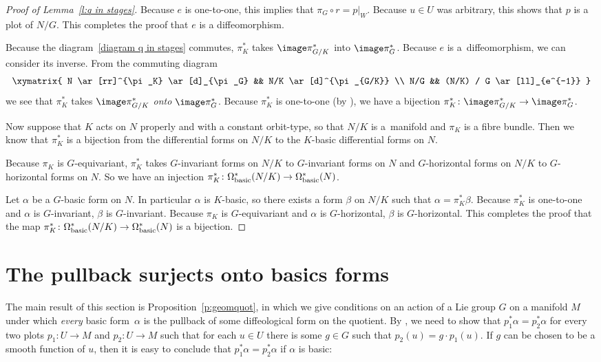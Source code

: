 \begin{proof}[Proof of Lemma~\ref{l:q in stages}]
Because $e$ is one-to-one, this implies that $\pi_G \circ r = p|_W$.
Because $u \in U$ was arbitrary, this shows that $p$ is a plot of $N/G$.
This completes the proof that $e$ is a dif\/feomorphism.

Because the diagram~\eqref{diagram q in stages} commutes, $\pi_K^*$
takes $\image \pi_{G/K}^*$ into $\image \pi_G^*$.
Because $e$ is a~dif\/feomorphism, we can consider its inverse.
From the commuting diagram
\begin{gather*} \xymatrix{
 N \ar[rr]^{\pi_K} \ar[d]_{\pi_G} && N/K \ar[d]^{\pi_{G/K}} \\
  N/G &&   (N/K) / G \ar[ll]_{e^{-1}}
} \end{gather*}
we see that $\pi_K^*$ takes $\image \pi_{G/K}^*$ \emph{onto} $\image \pi_G^*$.
Because $\pi_K^*$ is one-to-one (by ),
we have a bijection
$\pi_K^* \colon \image \pi_{G/K}^* \to \image \pi_G^*$.

Now suppose that $K$ acts on $N$ properly and with a constant orbit-type,
so that $N/K$ is a~mani\-fold and $\pi_K$ is a f\/ibre bundle.
Then we know that $\pi_K^*$ is a bijection from the dif\/ferential forms
on $N/K$ to the $K$-basic dif\/ferential forms on $N$.

Because $\pi_K$ is $G$-equivariant,
$\pi_K^*$ takes $G$-invariant forms on $N/K$
to $G$-invariant forms on $N$
and $G$-horizontal forms on $N/K$ to $G$-horizontal forms on $N$.
So we have an injection
$\pi_K^* \colon \Omega^*_{\rm basic}(N/K) \to \Omega^*_{\rm basic}(N)$.

Let $\alpha$ be a $G$-basic form on $N$. In particular $\alpha$ is $K$-basic,
so there exists a form $\beta$ on $N/K$ such that $\alpha = \pi_K^* \beta$.
Because $\pi_K^*$ is one-to-one and $\alpha$ is $G$-invariant,
$\beta$ is $G$-invariant.
Because $\pi_K$ is $G$-equivariant and $\alpha$ is $G$-horizontal,
$\beta$ is $G$-horizontal.
This completes the proof that the map
$\pi_K^* \colon \Omega^*_{\rm basic}(N/K) \to \Omega^*_{\rm basic}(N)$
is a bijection.
\end{proof}

\section{The pullback surjects onto basics forms} \label{sec:surjects}

The main result of this section is Proposition~\ref{p:geomquot},
in which we give conditions on an action of a Lie group $G$ on a manifold $M$
under which \emph{every} basic form~$\alpha$ is the pullback
of some dif\/feological form on the quotient.
By ,
we need to show that $p_1^*\alpha = p_2^*\alpha$ for every two plots
$p_1 \colon U \to M$ and $p_2 \colon U \to M$
such that
for each $u\in U$ there is some $g \in G$ such that $p_2(u) = g \cdot p_1(u)$.
If $g$ can be chosen to be a smooth function of $u$,
then it is easy to conclude that $p_1^*\alpha = p_2^*\alpha$
if $\alpha$ is basic:

